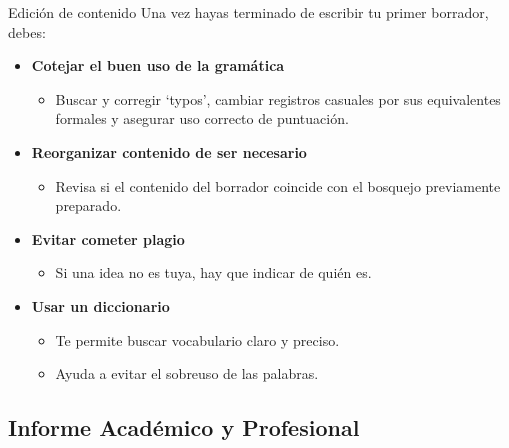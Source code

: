 \documentclass[
11pt, %
]{beamer}
\begin{document}
\begin{frame}{Edición de contenido}
	Una vez hayas terminado de escribir tu primer borrador, debes:
	\begin{itemize}
		\item \textbf{Cotejar el buen uso de la gramática}
		      \begin{itemize}
			      \item Buscar y corregir ‘typos’, cambiar registros casuales por sus equivalentes formales y asegurar uso correcto de puntuación.
		      \end{itemize}

		\item \textbf{Reorganizar contenido de ser necesario}
		      \begin{itemize}
			      \item Revisa si el contenido del borrador coincide con el bosquejo previamente preparado.
		      \end{itemize}

		\item \textbf{Evitar cometer plagio}
		      \begin{itemize}
			      \item Si una idea no es tuya, hay que indicar de quién es.
		      \end{itemize}

		\item \textbf{Usar un diccionario}
		      \begin{itemize}
			      \item Te permite buscar vocabulario claro y preciso.
			      \item Ayuda a evitar el sobreuso de las palabras.
		      \end{itemize}
	\end{itemize}
\end{frame}

\subsection{Informe Académico y Profesional}
\end{document}

